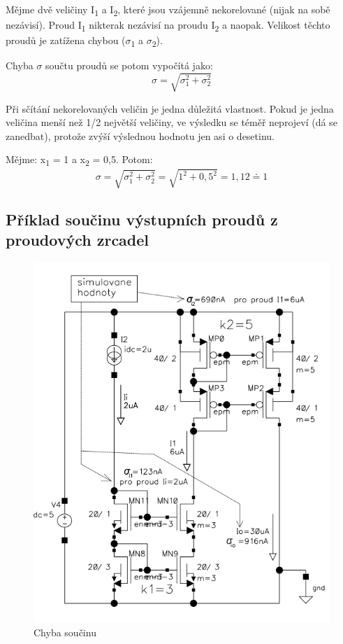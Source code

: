 Mějme dvě veličiny I\textsubscript{1} a I\textsubscript{2}, které jsou vzájemně nekorelované (nijak na sobě nezávisí). Proud I\textsubscript{1} nikterak nezávisí na proudu I\textsubscript{2} a naopak. Velikost těchto proudů je zatížena chybou ($\sigma$\textsubscript{1} a $\sigma$\textsubscript{2}).

Chyba $\sigma$ součtu proudů se potom vypočítá jako:
\begin{equation}
\sigma = \sqrt{\sigma_{1}^{2}+\sigma_{2}^{2}}
\end{equation}

Při sčítání nekorelovaných veličin je jedna důležitá vlastnost. Pokud je jedna veličina menší než 1/2 největší veličiny, ve výsledku se téměř neprojeví (dá se zanedbat), protože zvýší výslednou hodnotu jen asi o desetinu.

Mějme: x\textsubscript{1} = 1 a x\textsubscript{2} = 0,5. Potom:
\begin{equation}
\sigma = \sqrt{\sigma_{1}^{2}+\sigma_{2}^{2}}=\sqrt{1^{2}+0,5^{2}}=1,12\doteq 1
\end{equation}

\subsection{Příklad součinu výstupních proudů z proudových zrcadel}
\begin{figure}[h]
   \begin{center}
     \includegraphics[scale=0.5]{images/Soucin.png}
   \end{center}
   \caption{Chyba součinu}
\end{figure}

